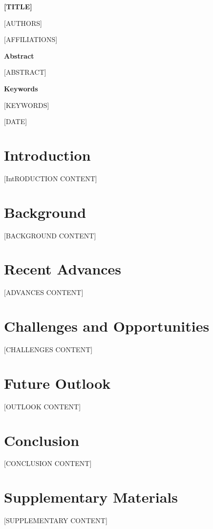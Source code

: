 \documentclass[12pt,a4paper]{article}
\begin{document}
\begin{titlepage}
\centering
\vspace*{2cm}

{\Huge\bfseries [TITLE]\par}

\vspace{1cm}

{\Large [AUTHORS]\par}

\vspace{0.5cm}

{\large [AFFILIATIONS]\par}

\vspace{2cm}

{\large\textbf{Abstract}\par}

\vspace{0.5cm}

{\large [ABSTRACT]\par}

\vspace{1cm}

{\large\textbf{Keywords}\par}

\vspace{0.5cm}

{\large [KEYWORDS]\par}

\vspace{2cm}

{\large [DATE]\par}

\end{titlepage}

\tableofcontents
\newpage

\section{Introduction}
[IntRODUCTION CONTENT]

\section{Background}
[BACKGROUND CONTENT]

\section{Recent Advances}
[ADVANCES CONTENT]

\section{Challenges and Opportunities}
[CHALLENGES CONTENT]

\section{Future Outlook}
[OUTLOOK CONTENT]

\section{Conclusion}
[CONCLUSION CONTENT]



\appendix
\section{Supplementary Materials}
[SUPPLEMENTARY CONTENT]
\end{document}
